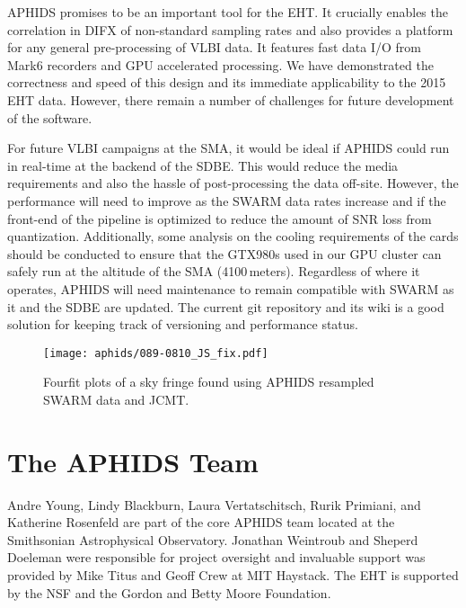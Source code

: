 APHIDS promises to be an important tool for the EHT.  It crucially enables the correlation in
DIFX of non-standard sampling rates and also provides a platform for any general pre-processing of 
VLBI data.  It features fast data I/O from Mark6 recorders and GPU accelerated processing.  
We have demonstrated the correctness and speed of this design and its immediate applicability to 
the 2015 EHT data.  However,
there remain a number of challenges for future development of the software.

For future VLBI campaigns at the SMA, it would be ideal if APHIDS could run in real-time 
at the backend of the SDBE.  This would reduce the media requirements and also the 
hassle of post-processing the data off-site.  However, the performance will need to improve as the
SWARM data rates increase and if the front-end of the pipeline is optimized to reduce the 
amount of SNR loss from quantization.  Additionally, some analysis on the cooling requirements 
of the cards should be conducted to ensure that the GTX980s used in our GPU cluster can safely run 
at the altitude of the SMA (4100\,meters).  Regardless of where it operates, APHIDS will need 
maintenance to remain compatible with SWARM as it and the SDBE are updated.  The current 
git repository and its wiki is a good solution for keeping track of versioning and performance status.

%
\begin{figure}
\texttt{[image: aphids/089-0810\_JS\_fix.pdf]}
\caption{Fourfit plots of a sky fringe found using APHIDS resampled SWARM data and JCMT.}
\label{fig:aphids_fringe}
\end{figure}

\section{The APHIDS Team}
Andre Young, Lindy Blackburn, Laura Vertatschitsch, Rurik Primiani, and Katherine Rosenfeld are part of 
the core APHIDS team located at the Smithsonian Astrophysical Observatory.  Jonathan Weintroub and Sheperd
Doeleman were responsible for project oversight and invaluable support was provided by Mike Titus and Geoff Crew at MIT
Haystack.  The EHT is supported by the NSF and the Gordon and Betty Moore Foundation.
